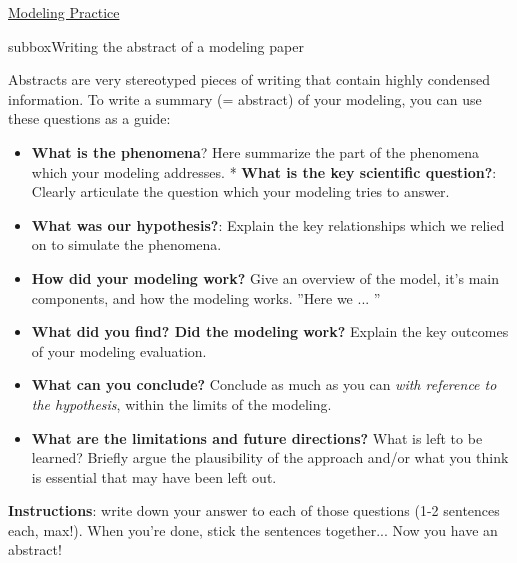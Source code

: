 \begin{textbox}{\href{https://compneuro.neuromatch.io/projects/modelingsteps/ModelingSteps_5through10.html}{Modeling Practice  } }

\begin{subbox}{subbox}{Writing the abstract of a modeling paper
}
\scriptsize
 
Abstracts are very stereotyped pieces of writing that contain highly condensed information. To write a summary (= abstract) of your modeling, you can use these questions as a guide: 
\begin{itemize}
    \item 
\textbf{What is the phenomena}?  Here summarize the part of the phenomena which your modeling addresses.
* \textbf{What is the key scientific question?}:  Clearly articulate the question which your modeling tries to answer.
\item \textbf{What was our hypothesis?}:  Explain the key relationships which we relied on to simulate the phenomena.
\item \textbf{How did your modeling work?} Give an overview of the model, it's main components, and how the modeling works.  ''Here we ... ''
\item \textbf{What did you find? Did the modeling work?} Explain the key outcomes of your modeling evaluation. 
\item \textbf{What can you conclude?} Conclude as much as you can \textit{with reference to the hypothesis}, within the limits of the modeling.  
\item \textbf{What are the limitations and future directions?} What is left to be learned? Briefly argue the plausibility of the approach and/or what you think is essential that may have been left out.
\end{itemize}


\textbf{Instructions}: write down your answer to each of those questions (1-2 sentences each, max!). When you're done, stick the sentences together... Now you have an abstract!

\end{subbox}
\end{textbox}
